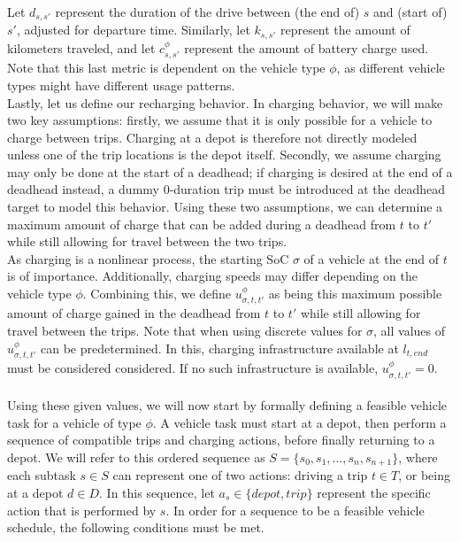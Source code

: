 \documentclass[]{article}
\begin{document}
Let $d_{s,s'}$ represent the duration of the drive between (the end of) $s$ and (start of) $s'$, adjusted for departure time. Similarly, let $k_{s, s'}$ represent the amount of kilometers traveled, and let $c^\phi_{s, s'}$ represent the amount of battery charge used. Note that this last metric is dependent on the vehicle type $\phi$, as different vehicle types might have different usage patterns. \\
Lastly, let us define our recharging behavior. In charging behavior, we will make two key assumptions: firstly, we assume that it is only possible for a vehicle to charge between trips. Charging at a depot is therefore not directly modeled unless one of the trip locations is the depot itself. Secondly, we assume charging may only be done at the start of a deadhead; if charging is desired at the end of a deadhead instead, a dummy 0-duration trip must be introduced at the deadhead target to model this behavior. Using these two assumptions, we can determine a maximum amount of charge that can be added during a deadhead from $t$ to $t'$ while still allowing for travel between the two trips. \\
As charging is a nonlinear process, the starting SoC $\sigma$ of a vehicle at the end of $t$ is of importance. Additionally, charging speeds may differ depending on the vehicle type $\phi$. Combining this, we define $u^\phi_{\sigma,t,t'}$ as being this maximum possible amount of charge gained in the deadhead from $t$ to $t'$ while still allowing for travel between the trips. Note that when using discrete values for $\sigma$, all values of $u^\phi_{\sigma,t, t'}$ can be predetermined. In this, charging infrastructure available at $l_{t,end}$ must be considered considered. If no such infrastructure is available, $u^\phi_{\sigma,t, t'} = 0$. \\\\
Using these given values, we will now start by formally defining a feasible vehicle task for a vehicle of type $\phi$. A vehicle task must start at a depot, then perform a sequence of compatible trips and charging actions, before finally returning to a depot. We will refer to this ordered sequence as $S = \{ s_0, s_1, \dots, s_n, s_{n+1} \}$, where each subtask $s \in S$ can represent one of two actions: driving a trip $t \in T$, or being at a depot $d \in D$. In this sequence, let $a_s \in \{ depot, trip \}$ represent the specific action that is performed by $s$. In order for a sequence to be a feasible vehicle schedule, the following conditions must be met. \\
\end{document}
